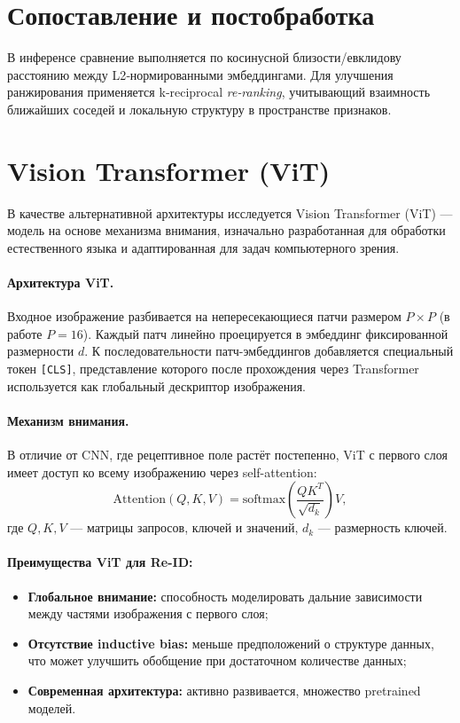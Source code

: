 \section{Сопоставление и постобработка}
В инференсе сравнение выполняется по косинусной близости/евклидову расстоянию между L2‑нормированными эмбеддингами. Для улучшения ранжирования применяется k‑reciprocal \emph{re‑ranking}, учитывающий взаимность ближайших соседей и локальную структуру в пространстве признаков. %

\section{Vision Transformer (ViT)}
В качестве альтернативной архитектуры исследуется Vision Transformer (ViT) — модель на основе механизма внимания, изначально разработанная для обработки естественного языка и адаптированная для задач компьютерного зрения.

\paragraph{Архитектура ViT.} Входное изображение разбивается на непересекающиеся патчи размером \(P \times P\) (в работе \(P=16\)). Каждый патч линейно проецируется в эмбеддинг фиксированной размерности \(d\). К последовательности патч-эмбеддингов добавляется специальный токен \texttt{[CLS]}, представление которого после прохождения через Transformer используется как глобальный дескриптор изображения.

\paragraph{Механизм внимания.} В отличие от CNN, где рецептивное поле растёт постепенно, ViT с первого слоя имеет доступ ко всему изображению через self-attention:
\begin{equation}
\text{Attention}(Q, K, V) = \text{softmax}\left(\frac{QK^T}{\sqrt{d_k}}\right)V,
\end{equation}
где \(Q, K, V\) — матрицы запросов, ключей и значений, \(d_k\) — размерность ключей.

\paragraph{Преимущества ViT для Re-ID:}
\begin{itemize}
  \item \textbf{Глобальное внимание:} способность моделировать дальние зависимости между частями изображения с первого слоя;
  \item \textbf{Отсутствие inductive bias:} меньше предположений о структуре данных, что может улучшить обобщение при достаточном количестве данных;
  \item \textbf{Современная архитектура:} активно развивается, множество pretrained моделей.
\end{itemize}

